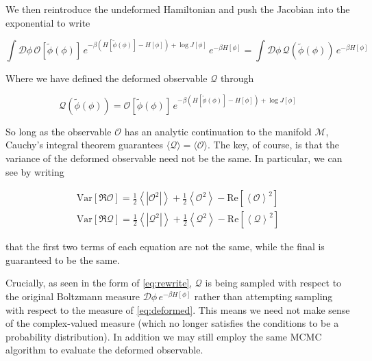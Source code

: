 \documentclass[12pt]{article}
\begin{document}
We then reintroduce the undeformed Hamiltonian and push the Jacobian into the exponential to write

\begin{equation} \label{eq:rewrite}
	\int \mathcal{D}\phi \, \mathcal{O}[\tilde{\phi}(\phi)] \, e^{-\beta \left( H[\tilde{\phi}(\phi)] - H[\phi] \right) + \log J[\phi]}\, e^{-\beta H[\phi]} 
	= \int \mathcal{D}\phi \, \mathcal{Q}(\tilde{\phi}(\phi)) \, e^{-\beta H[\phi]} 
\end{equation}

Where we have defined the deformed observable $\mathcal{Q}$ through

\begin{equation}
	 \mathcal{Q}(\tilde{\phi}(\phi)) = \mathcal{O}[\tilde{\phi}(\phi)] \, e^{-\beta \left( H[\tilde{\phi}(\phi)] - H[\phi] \right) + \log J[\phi]}
\end{equation}

So long as the observable $\mathcal{O}$ has an analytic continuation to the manifold $\mathcal{M}$, Cauchy's integral theorem guarantees 
$\langle \mathcal{Q} \rangle = \langle \mathcal{O} \rangle$. The key, of course, is that the variance of the deformed observable need not be the
same. In particular, we can see by writing

\begin{equation} \label{eq:variances}
	\begin{split}
	\mathrm{Var}[\Re \mathcal{O}] = \frac{1}{2} \left\langle \left| \mathcal{O}^2 \right| \right\rangle + \frac{1}{2} \left\langle \mathcal{O}^2 \right\rangle 
	- \mathrm{Re}\left[ \left\langle \mathcal{O} \right\rangle^2 \right] \\ 
	\mathrm{Var}[\Re \mathcal{Q}] = \frac{1}{2} \left\langle \left| \mathcal{Q}^2 \right| \right\rangle + \frac{1}{2} \left\langle \mathcal{Q}^2 \right\rangle 
	- \mathrm{Re}\left[ \left\langle \mathcal{Q} \right\rangle^2 \right]
	\end{split}
\end{equation}

that the first two terms of each equation are not the same, while the final is guaranteed to be the same.

Crucially, as seen in the form of \ref{eq:rewrite}, $\mathcal{Q}$ is being sampled with respect to the original Boltzmann measure $\mathcal{D}\phi\, e^{-\beta H[\phi]}$
rather than attempting sampling with respect to the measure of \ref{eq:deformed}. This means we need not make sense of the complex-valued measure (which no
longer satisfies the conditions to be a probability distribution). In addition we may still employ the same MCMC algorithm to evaluate the deformed observable.
\end{document}
